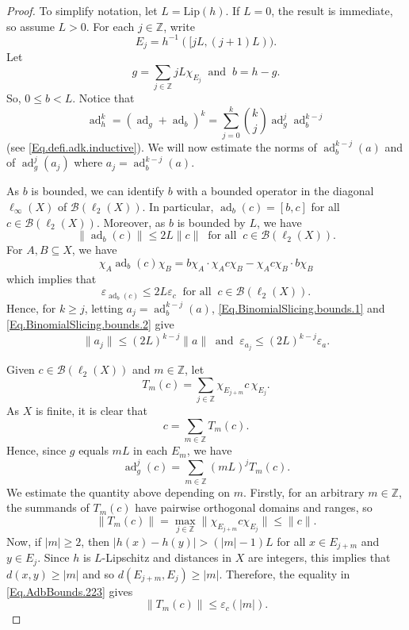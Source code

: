 \documentclass[11pt]{amsart}
\newcommand{\Z}{\mathbb{Z}}
\newcommand{\cB}{\mathcal{B}}
\newcommand{\eps}{\varepsilon}
\newcommand{\Lip}{\mathrm{Lip}}
\numberwithin{equation}{section}
\theoremstyle{definition}
\theoremstyle{remark}
\DeclareMathOperator{\ad}{ad}
\begin{document}
\begin{proof}
To simplify notation, let $L=\Lip(h)$. If $L=0$, the result is immediate, so assume $L>0$. For each $j\in\Z$, write \[E_j=h^{-1}([jL,(j+1)L)).\]    Let \[g=\sum_{j\in \Z} jL\chi_{E_j}\ \text{  and }\  b=h-g.\] So,   $0\leq b<L$. Notice that
\begin{equation}\label{Eq.BinomialSlicing}
\ad_h^k=(\ad_g+\ad_b)^k=\sum_{j=0}^k\binom kj \ad_g^j\ad_b^{k-j}
\end{equation}
(see \eqref{Eq.defi.adk.inductive}).
We will now estimate the norms of  $\ad_b^{k-j}(a)$ and of $\ad_g^j(a_j)$ where $a_j=\ad_b^{k-j}(a)$.



As $b$ is bounded, we can identify $b$ with a bounded operator in the diagonal $\ell_\infty(X)$ of $\cB(\ell_2(X))$. In particular,    $\ad_b(c)=[b,c]$ for all $c\in \cB(\ell_2(X))$. Moreover, as $b$ is bounded by $L$, we have  \begin{equation}\label{Eq.BinomialSlicing.bounds.1}\|\ad_b(c)\|\leq 2L\|c\|\ \text{  for all }\ c\in\cB(\ell_2(X)).\end{equation}
For $A,B\subseteq X$, we have \[ \chi_A\ad_b(c)\chi_B=b\chi_A\cdot \chi_Ac\chi_B-\chi_Ac\chi_B\cdot b\chi_B\] which implies that   \begin{equation}\label{Eq.BinomialSlicing.bounds.2}\eps_{\ad_b(c)}\leq2L \eps_c \ \text{  for all }\ c\in\cB(\ell_2(X)).\end{equation}
Hence, for $k\geq j$, letting $a_j=\ad_b^{k-j}(a)$, \eqref{Eq.BinomialSlicing.bounds.1} and \eqref{Eq.BinomialSlicing.bounds.2} give
\begin{equation}\label{Eq.AdbBounds}
\|a_j\|\leq(2L)^{k-j}\|a\|\ \text{ and }\ \eps_{a_j}\leq(2L)^{k-j}\eps_a.
\end{equation}


Given $c\in \cB(\ell_2(X))$ and   $m\in\Z$, let
\[T_m(c)=\sum_{j\in\Z}\chi_{E_{j+m}}c\,\chi_{E_{j}}.\]
As $X$ is finite, it is clear that
\[c=\sum_{m\in\Z} T_m(c).\]
Hence, since $g$ equals $mL$ in each $E_m$, we have \begin{equation}\label{Eq.AdbBounds.223.0}\ad^j_g(c)=\sum_{m\in\Z}(  mL)^jT_m(c).\end{equation}
We estimate the quantity above depending on $m$. Firstly, for an arbitrary $m\in\Z$,  the summands of $T_m(c)$ have pairwise orthogonal domains and ranges, so \begin{equation}\label{Eq.AdbBounds.223}\|T_m(c)\|=\max_{j\in\Z}\|\chi_{E_{j+m}}c\chi_{E_{j}}\|\leq\|c\|.\end{equation}
Now, if  $|m|\geq2$,  then $|h(x)-h(y)|>(|m|-1)L$ for all  $x\in E_{j+m}$ and $y\in E_{j}$. Since $h$ is $L$-Lipschitz and distances in $X$ are integers,  this implies that $d(x,y)\geq|m|$ and so   $d(E_{j+m},E_{j})\geq|m|$. Therefore, the equality in \eqref{Eq.AdbBounds.223} gives \begin{equation}\label{Eq.AdbBounds.223.1}\|T_m(c)\|\leq\eps_c(|m|).\end{equation}


\end{proof}
\end{document}
